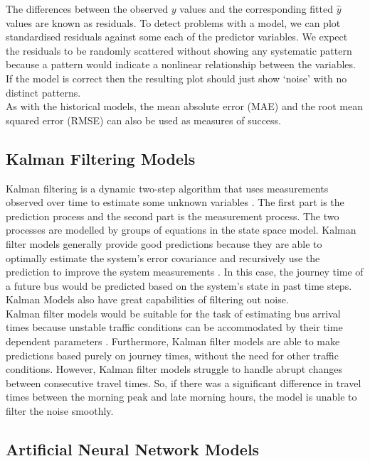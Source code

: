 The differences between the observed $y$ values and the corresponding fitted $\hat y$ values are known as residuals. To detect problems with a model, we can plot standardised residuals against some each of the predictor variables. We expect the residuals to be randomly scattered without showing any systematic pattern because a pattern would indicate a nonlinear relationship between the variables. If the model is correct then the resulting plot should just show `noise' with no distinct patterns. \\

As with the historical models, the mean absolute error (MAE) and the root mean squared error (RMSE) can also be used as measures of success.

\subsection{Kalman Filtering Models}
\label{section:kalman-models-research}

Kalman filtering is a dynamic two-step algorithm that uses measurements observed over time to estimate some unknown variables \cite{kalman-korean}. The first part is the prediction process and the second part is the measurement process. The two processes are modelled by groups of equations in the state space model. Kalman filter models generally provide good predictions because they are able to optimally estimate the system's error covariance and recursively use the prediction to improve the system measurements \cite{kalman-malay}. In this case, the journey time of a future bus would be predicted based on the system's state in past time steps. Kalman Models also have great capabilities of filtering out noise.  \\

Kalman filter models would be suitable for the task of estimating bus arrival times because unstable traffic conditions can be accommodated by their time dependent parameters \cite{dynamic-gps}. Furthermore, Kalman filter models are able to make predictions based purely on journey times, without the need for other traffic conditions. However, Kalman filter models struggle to handle abrupt changes between consecutive travel times. So, if there was a significant difference in travel times between the morning peak and late morning hours, the model is unable to filter the noise smoothly. 

\subsection{Artificial Neural Network Models}
\label{section:ml-models-research}

